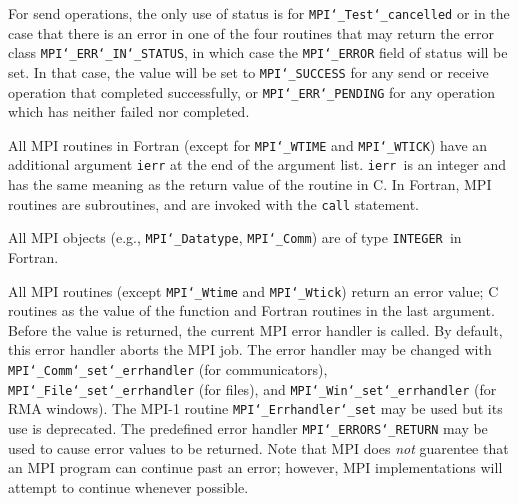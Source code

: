 For send operations, the only use of status is for {\tt MPI{\tt \char`\_}Test{\tt \char`\_}cancelled} or
in the case that there is an error in one of the four routines that
may return the error class {\tt MPI{\tt \char`\_}ERR{\tt \char`\_}IN{\tt \char`\_}STATUS}, in which case the
{\tt MPI{\tt \char`\_}ERROR} field of status will be set.  In that case, the value
will be set to {\tt MPI{\tt \char`\_}SUCCESS} for any send or receive operation that completed
successfully, or {\tt MPI{\tt \char`\_}ERR{\tt \char`\_}PENDING} for any operation which has neither
failed nor completed.
\par
{}
All MPI routines in Fortran (except for {\tt MPI{\tt \char`\_}WTIME} and {\tt MPI{\tt \char`\_}WTICK}) have
an additional argument {\tt ierr} at the end of the argument list.  {\tt ierr
}is an integer and has the same meaning as the return value of the routine
in C.  In Fortran, MPI routines are subroutines, and are invoked with the
{\tt call} statement.
\par
All MPI objects (e.g., {\tt MPI{\tt \char`\_}Datatype}, {\tt MPI{\tt \char`\_}Comm}) are of type {\tt INTEGER
}in Fortran.
\par
{}
\par
All MPI routines (except {\tt MPI{\tt \char`\_}Wtime} and {\tt MPI{\tt \char`\_}Wtick}) return an error value;
C routines as the value of the function and Fortran routines in the last
argument.  Before the value is returned, the current MPI error handler is
called.  By default, this error handler aborts the MPI job.  The error handler
may be changed with {\tt MPI{\tt \char`\_}Comm{\tt \char`\_}set{\tt \char`\_}errhandler} (for communicators),
{\tt MPI{\tt \char`\_}File{\tt \char`\_}set{\tt \char`\_}errhandler} (for files), and {\tt MPI{\tt \char`\_}Win{\tt \char`\_}set{\tt \char`\_}errhandler} (for
RMA windows).  The MPI-1 routine {\tt MPI{\tt \char`\_}Errhandler{\tt \char`\_}set} may be used but
its use is deprecated.  The predefined error handler
{\tt MPI{\tt \char`\_}ERRORS{\tt \char`\_}RETURN} may be used to cause error values to be returned.
Note that MPI does {\em not} guarentee that an MPI program can continue past
an error; however, MPI implementations will attempt to continue whenever
possible.
\par
{}
\endmanpage
